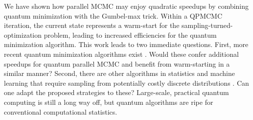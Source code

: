 \documentclass[12pt]{article} %
\begin{document}
We have shown how parallel MCMC may enjoy quadratic speedups by combining quantum minimization with the Gumbel-max trick.  Within a QPMCMC iteration, the current state represents a warm-start for the sampling-turned-optimization problem, leading to increased efficiencies for the quantum minimization algorithm.  This work leads to two immediate questions.  First, more recent quantum minimization algorithms exist \citep{baritompa2005grover,farhi2014quantum}.  Would these confer additional speedups for quantum parallel MCMC and benefit from warm-starting in a similar manner? Second, there are other algorithms in statistics and machine learning that require sampling from potentially costly discrete distributions \citep{liu2001theoretical,csillery2010approximate}.  Can one adapt  the proposed strategies to these?  Large-scale, practical quantum computing is still a long way off, but quantum algorithms are ripe for conventional computational statistics.




\appendix




\end{document}
